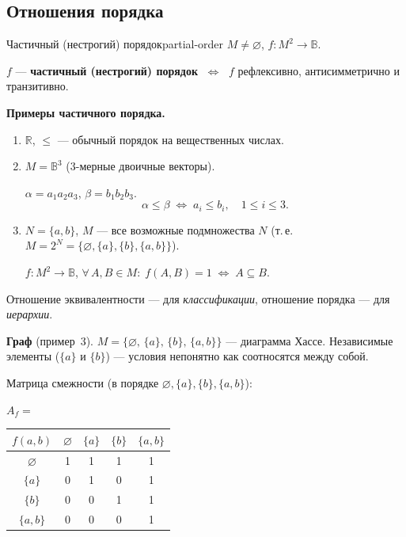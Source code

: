 \bigskip
\subsection*{Отношения порядка}

\begin{defn}{Частичный (нестрогий) порядок}{partial-order}
$M \neq \varnothing$,\; $f\colon M^2 \to \mathbb{B}$.

$f$ --- \textbf{частичный (нестрогий) порядок}
$\;\Leftrightarrow\;$ $f$ рефлексивно, антисимметрично и транзитивно.
\end{defn}

\textbf{Примеры частичного порядка.}

\begin{enumerate}
  \item $\mathbb{R}$, $\leq$ --- обычный порядок на вещественных числах.

  \item $M = \mathbb{B}^3$ (3-мерные двоичные векторы).

        $\alpha = a_1 a_2 a_3$,\; $\beta = b_1 b_2 b_3$.
        \[
          \alpha \leq \beta \;\Leftrightarrow\;
          a_i \leq b_i,\quad 1 \leq i \leq 3.
        \]

  \item $N = \{a, b\}$,\; $M$ --- все возможные подмножества $N$
        (т.\,е. $M = 2^N = \{\varnothing, \{a\}, \{b\}, \{a,b\}\}$).

        $f\colon M^2 \to \mathbb{B}$,\quad
        $\forall\, A, B \in M\colon\; f(A,B) = 1 \;\Leftrightarrow\; A \subseteq B$.
\end{enumerate}

\medskip
Отношение эквивалентности --- для \textit{классификации},
отношение порядка --- для \textit{иерархии}.

\medskip
\textbf{Граф} (пример~3). $M = \{\varnothing,\, \{a\},\, \{b\},\, \{a,b\}\}$ ---
диаграмма Хассе. Независимые элементы ($\{a\}$ и $\{b\}$) ---
условия непонятно как соотносятся между собой.

Матрица смежности (в порядке $\varnothing, \{a\}, \{b\}, \{a,b\}$):
\begin{center}
\renewcommand{\arraystretch}{1.25}
$A_f=$\;
\begin{tabular}{|c||*{4}{c|}}
\hline
$f(a,b)$ & $\varnothing$ & $\{a\}$ & $\{b\}$ & $\{a,b\}$ \\ \hline\hline
$\varnothing$  & 1 & 1 & 1 & 1 \\ \hline
$\{a\}$        & 0 & 1 & 0 & 1 \\ \hline
$\{b\}$        & 0 & 0 & 1 & 1 \\ \hline
$\{a,b\}$      & 0 & 0 & 0 & 1 \\ \hline
\end{tabular}
\end{center}


